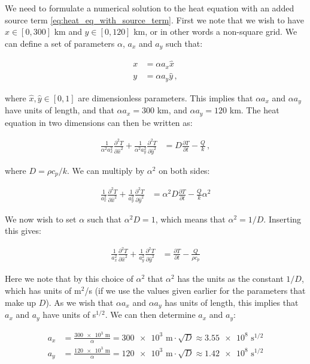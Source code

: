\documentclass[reprint,english,notitlepage]{revtex4-1}  %
\begin{document}
We need to formulate a numerical solution to the heat equation with an added source term \eqref{eq:heat_eq_with_source_term}. First we note that we wish to have $x \in [0,300]$ km and $y \in [0,120]$ km, or in other words a non-square grid. We can define a set of parameters $\alpha$, $a_x$ and $a_y$ such that:

\begin{align*}
x &= \alpha a_x \hat{x} \\
y &= \alpha a_y \hat{y} \, ,
\end{align*}

where $\hat{x},\hat{y} \in [0,1]$ are dimensionless parameters. This implies that $\alpha a_x$ and $\alpha a_y$ have units of length, and that $\alpha a_x = 300$ km, and $\alpha a_y = 120$ km. The heat equation in two dimensions can then be written as:

\begin{align*}
\frac{1}{\alpha^2 a_x^2}\frac{\partial^2 T}{\partial \hat{x}^2} + \frac{1}{\alpha^2 a_y^2} \frac{\partial^2 T}{\partial \hat{y}^2} &= D\frac{\partial T}{\partial t} - \frac{Q}{k} \, ,
\end{align*} 

where $D = \rho c_p /k$. We can multiply by $\alpha^2$ on both sides:

\begin{align*}
\frac{1}{a_x^2}\frac{\partial^2 T}{\partial \hat{x}^2} + \frac{1}{a_y^2} \frac{\partial^2 T}{\partial \hat{y}^2} &= \alpha^2 D \frac{\partial T}{\partial t} - \frac{Q}{k}\alpha^2 
\end{align*}

We now wish to set $\alpha$ such that $\alpha^2 D = 1$, which means that $\alpha^2 = 1/D$. Inserting this gives:

\begin{align*}
\frac{1}{a_x^2} \frac{\partial^2 T}{\partial \hat{x}^2} + \frac{1}{a_y^2} \frac{\partial^2 T}{\partial \hat{y}^2} &=  \frac{\partial T}{\partial t} - \frac{Q}{\rho c_p}
\end{align*}

Here we note that by this choice of $\alpha^2 $ that $\alpha^2$ has the units as the constant $1/D$, which has units of m$^2$/s (if we use the values given earlier for the parameters that make up $D$). As we wish that $\alpha a_x$ and $\alpha a_y$ has units of length, this implies that $a_x$ and $a_y$ have units of s$^{1/2}$. We can then determine $a_x$ and $a_y$:

\begin{align*}
a_x &= \frac{\num{300e3} \text{ m}}{\alpha} = \num{300e3}\text{ m} \cdot \sqrt{D} \approx \num{3.55e8} \text{ s}^{1/2} \\
a_y &= \frac{\num{120e3} \text{ m}}{\alpha} = \num{120e3}\text{ m} \cdot \sqrt{D} \approx \num{1.42e8} \text{ s}^{1/2}
\end{align*}
\end{document}
